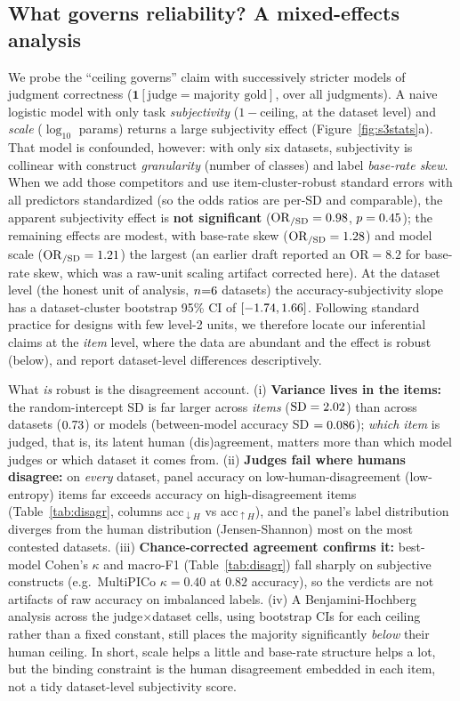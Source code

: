 \subsection{What governs reliability? A mixed-effects analysis}
We probe the ``ceiling governs'' claim with successively stricter models of judgment correctness
($\mathbf{1}[\text{judge}=\text{majority gold}]$, over all \STHRn{} judgments). A naive logistic model with only task
\emph{subjectivity} ($1\!-\!$ceiling, at the dataset level) and \emph{scale} ($\log_{10}$ params) returns a large
subjectivity effect (Figure~\ref{fig:s3stats}a). That model is confounded, however: with only six datasets,
subjectivity is collinear with construct \emph{granularity} (number of classes) and label \emph{base-rate skew}.
When we add those competitors and use item-cluster-robust standard errors with all predictors standardized (so the
odds ratios are per-SD and comparable), the apparent subjectivity effect is \textbf{not significant}
($\mathrm{OR}_{/\mathrm{SD}}=0.98$, $p=0.45$); the remaining effects are modest, with base-rate skew
($\mathrm{OR}_{/\mathrm{SD}}=1.28$) and model scale ($\mathrm{OR}_{/\mathrm{SD}}=1.21$) the largest
(an earlier draft reported an $\mathrm{OR}{=}8.2$ for base-rate skew, which was a raw-unit scaling artifact corrected
here). At the dataset level (the honest unit of analysis, $n{=}6$ datasets) the accuracy-subjectivity slope has
a dataset-cluster bootstrap 95\% CI of $[-1.74,1.66]$. Following standard practice for designs with
few level-2 units, we therefore locate our inferential claims at the \emph{item} level, where the data are abundant
and the effect is robust (below), and report dataset-level differences descriptively.

What \emph{is} robust is the disagreement account. (i) \textbf{Variance lives in the items:} the random-intercept SD
is far larger across \emph{items} ($\mathrm{SD}=2.02$) than across datasets ($0.73$) or models
(between-model accuracy SD $=0.086$); \emph{which item} is judged, that is, its latent human (dis)agreement,
matters more than which model judges or which dataset it comes from. (ii) \textbf{Judges fail where humans disagree:}
on \emph{every} dataset, panel accuracy on low-human-disagreement (low-entropy) items far exceeds accuracy on
high-disagreement items (Table~\ref{tab:disagr}, columns acc$_{\downarrow H}$ vs acc$_{\uparrow H}$), and the panel's
label distribution diverges from the human distribution (Jensen-Shannon) most on the most contested datasets.
(iii) \textbf{Chance-corrected agreement confirms it:} best-model Cohen's $\kappa$ and macro-F1
(Table~\ref{tab:disagr}) fall sharply on subjective constructs (e.g.\ MultiPICo $\kappa{=}0.40$ at $0.82$ accuracy),
so the verdicts are not artifacts of raw accuracy on imbalanced labels. (iv) A Benjamini-Hochberg analysis across the
\SMEfdrtests{} judge$\times$dataset cells, using bootstrap CIs for each ceiling rather than a fixed constant, still
places the majority significantly \emph{below} their human ceiling. In short, scale helps a little and base-rate
structure helps a lot, but the binding constraint is the human disagreement embedded in each item, not a tidy
dataset-level subjectivity score.

